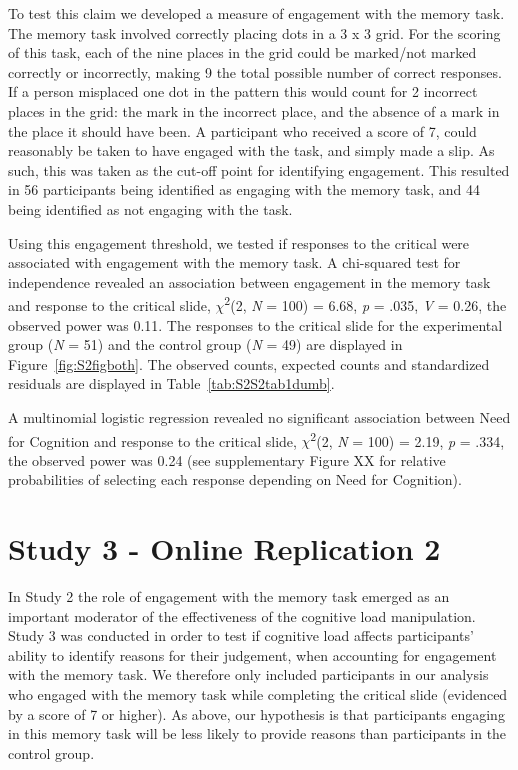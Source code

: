 \documentclass[
  american,
  man,floatsintext]{apa7}
\begin{document}
To test this claim we developed a measure of engagement with the memory task. The memory task involved correctly placing dots in a 3 x 3 grid. For the scoring of this task, each of the nine places in the grid could be marked/not marked correctly or incorrectly, making 9 the total possible number of correct responses. If a person misplaced one dot in the pattern this would count for 2 incorrect places in the grid: the mark in the incorrect place, and the absence of a mark in the place it should have been. A participant who received a score of 7, could reasonably be taken to have engaged with the task, and simply made a slip. As such, this was taken as the cut-off point for identifying engagement. This resulted in 56 participants being identified as engaging with the memory task, and 44 being identified as not engaging with the task.

Using this engagement threshold, we tested if responses to the critical were associated with engagement with the memory task. A chi-squared test for independence revealed an association between engagement in the memory task and response to the critical slide, \(\chi\)\textsuperscript{2}(2, \emph{N} = 100) = 6.68, \emph{p} = .035, \emph{V} = 0.26, the observed power was 0.11. The responses to the critical slide for the experimental group (\emph{N} = 51) and the control group (\emph{N} = 49) are displayed in Figure~\ref{fig:S2figboth}. The observed counts, expected counts and standardized residuals are displayed in Table~\ref{tab:S2S2tab1dumb}.

A multinomial logistic regression revealed no significant association between Need for Cognition and response to the critical slide, \(\chi\)\textsuperscript{2}(2, \emph{N} = 100) = 2.19, \emph{p} = .334, the observed power was 0.24 (see supplementary Figure XX for relative probabilities of selecting each response depending on Need for Cognition).

\hypertarget{study-3---online-replication-2}{%
\section{Study 3 - Online Replication 2}\label{study-3---online-replication-2}}

In Study 2 the role of engagement with the memory task emerged as an important moderator of the effectiveness of the cognitive load manipulation. Study 3 was conducted in order to test if cognitive load affects participants' ability to identify reasons for their judgement, when accounting for engagement with the memory task. We therefore only included participants in our analysis who engaged with the memory task while completing the critical slide (evidenced by a score of 7 or higher). As above, our hypothesis is that participants engaging in this memory task will be less likely to provide reasons than participants in the control group.
\end{document}
